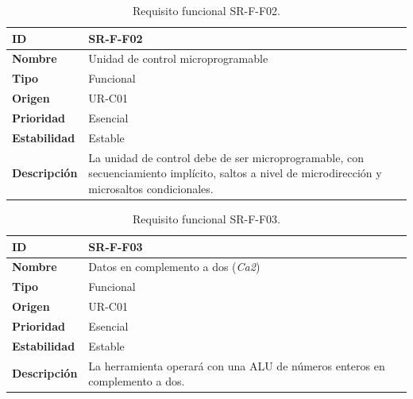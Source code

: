 \begin{center}
\begin{table}[htbp]
\centering
\caption{Requisito funcional SR-F-F02.}
\begin{tabular}{@{}p{2.5cm} p{9cm}@{}} 
\toprule
\textbf{ID} 				& SR-F-F02 \\
\midrule
\textbf{Nombre} 			& Unidad de control microprogramable \\
\midrule
\textbf{Tipo} 			& Funcional \\
\midrule
\textbf{Origen} 			& UR-C01 \\
\midrule
\textbf{Prioridad}		& Esencial \\
\midrule
\textbf{Estabilidad} 		& Estable \\
\midrule
\textbf{Descripción} 	& La unidad de control debe de ser microprogramable, con secuenciamiento implícito, saltos a nivel de microdirección y microsaltos condicionales. \\
\bottomrule
\end{tabular}
\label{tab:srff02}
\end{table}
\end{center}

\begin{center}
\begin{table}[htbp]
\centering
\caption{Requisito funcional SR-F-F03.}
\begin{tabular}{@{}p{2.5cm} p{9cm}@{}} 
\toprule
\textbf{ID} 				& SR-F-F03 \\
\midrule
\textbf{Nombre} 			& Datos en complemento a dos (\emph{Ca2}) \\
\midrule
\textbf{Tipo} 			& Funcional \\
\midrule
\textbf{Origen} 			& UR-C01 \\
\midrule
\textbf{Prioridad}		& Esencial \\
\midrule
\textbf{Estabilidad} 		& Estable \\
\midrule
\textbf{Descripción} 	& La herramienta operará con una ALU de números enteros en complemento a dos. \\
\bottomrule
\end{tabular}
\label{tab:srff03}
\end{table}
\end{center}

